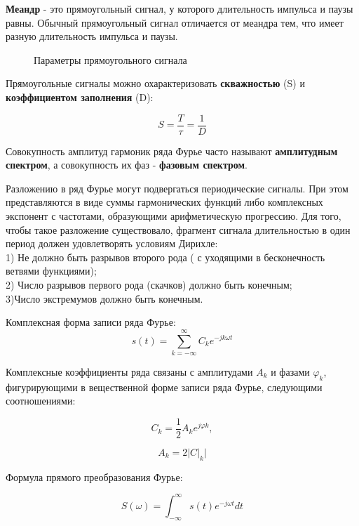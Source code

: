 \documentclass[12pt,a4paper]{scrartcl}
\begin{document}
\textbf{Меандр} - это прямоугольный сигнал, у которого длительность импульса и паузы равны. Обычный прямоугольный сигнал отличается от меандра тем, что имеет разную длительность импульса и паузы. 

\begin{figure}[h!]
\caption{Параметры прямоугольного сигнала}
\end{figure}

Прямоугольные сигналы можно охарактеризовать \textbf{скважностью} (S) и \textbf{коэффициентом заполнения} (D):

$$S=\frac{T}{\tau}=\frac{1}{D}$$

Совокупность амплитуд гармоник ряда Фурье часто называют \textbf{амплитудным спектром}, а совокупность их фаз - \textbf{фазовым спектром}.

Разложению в ряд Фурье могут подвергаться периодические сигналы. При этом представляются в виде суммы гармонических функций либо комплексных экспонент с частотами, образующими арифметическую прогрессию. Для того, чтобы такое разложение существовало, фрагмент сигнала длительностью в один период должен удовлетворять условиям Дирихле:\\
1) Не должно быть разрывов второго рода ( с уходящими в бесконечность ветвями функциями);\\
2) Число разрывов первого рода (скачков) должно быть конечным;\\
3)Число экстремумов должно быть конечным.

Комплексная форма записи ряда Фурье:
$$s(t)=\sum_{k=-\infty}^\infty C_k e^{-jk\omega t}$$

Комплексные коэффициенты ряда связаны с амплитудами $A_k$ и фазами $\varphi _k$, фигурирующими в вещественной форме записи ряда Фурье, следующими соотношениями:

$$C_k = \frac{1}{2}A_k e^{j\varphi k},$$

$$A_k = 2|C|_k|$$

Формула прямого преобразования Фурье:

$$S(\omega) = \int_{-\infty}^\infty s(t) e^{-j\omega t} dt$$
\end{document}

